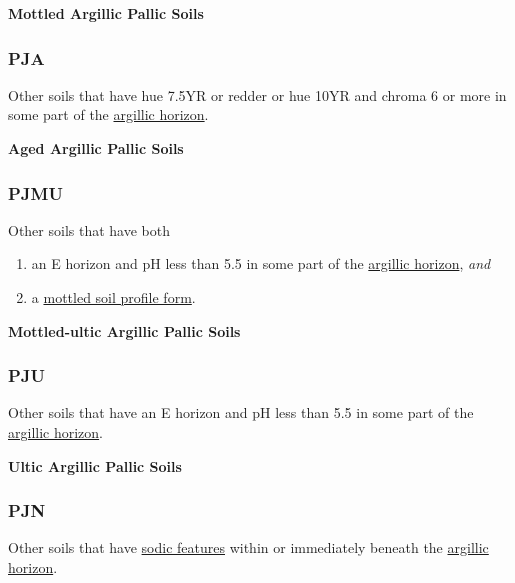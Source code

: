 \documentclass[
  letterpaper,
  DIV=11,
  numbers=noendperiod]{scrreprt}
\providecommand{\tightlist}{%
  \setlength{\itemsep}{0pt}\setlength{\parskip}{0pt}}\usepackage{longtable,booktabs,array}
\begin{document}
\textbf{Mottled Argillic Pallic Soils}

\hypertarget{sec-key-PJA}{%
\subsubsection{\texorpdfstring{\textbf{PJA}}{PJA}}\label{sec-key-PJA}}

Other soils that have hue 7.5YR or redder or hue 10YR and chroma 6 or
more in some part of the \protect\hyperlink{sec-diag-argh}{argillic
horizon}.

\textbf{Aged Argillic Pallic Soils}

\hypertarget{sec-key-PJMU}{%
\subsubsection{\texorpdfstring{\textbf{PJMU}}{PJMU}}\label{sec-key-PJMU}}

Other soils that have both

\begin{enumerate}
\def\labelenumi{\arabic{enumi}.}
\tightlist
\item
  an E horizon and pH less than 5.5 in some part of the
  \protect\hyperlink{sec-diag-argh}{argillic horizon}, \emph{and}
\item
  a \protect\hyperlink{sec-diag-mottpf}{mottled soil profile form}.
\end{enumerate}

\textbf{Mottled-ultic Argillic Pallic Soils}

\hypertarget{sec-key-PJU}{%
\subsubsection{\texorpdfstring{\textbf{PJU}}{PJU}}\label{sec-key-PJU}}

Other soils that have an E horizon and pH less than 5.5 in some part of
the \protect\hyperlink{sec-diag-argh}{argillic horizon}.

\textbf{Ultic Argillic Pallic Soils}

\hypertarget{sec-key-PJN}{%
\subsubsection{\texorpdfstring{\textbf{PJN}}{PJN}}\label{sec-key-PJN}}

Other soils that have \protect\hyperlink{sec-diag-sod}{sodic features}
within or immediately beneath the
\protect\hyperlink{sec-diag-argh}{argillic horizon}.
\end{document}
